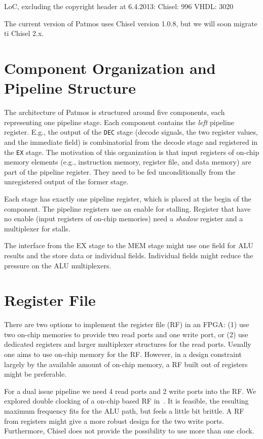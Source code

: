\documentclass[a4paper,fontsize=10pt,twoside,DIV15,BCOR12mm,headinclude=true,footinclude=false,pagesize,bibtotoc]{scrbook}
\newcommand{\code}[1]{{\texttt{#1}}}
\newcommand{\comment}[3]{

\textsf{\textbf{#1}} {\color{#3}#2}}
\newcommand{\martin}[1]{\comment{Martin}{#1}{Blue}}
\renewcommand{\martin}[1]{}
\begin{document}
LoC, excluding the copyright header at 6.4.2013:
Chisel: 996
VHDL: 3020

The current version of Patmos uses Chisel version 1.0.8, but we will soon
migrate ti Chisel 2.x.

\section{Component Organization and Pipeline Structure}

The architecture of Patmos is structured around five components, each
representing one pipeline stage. Each component contains the \emph{left}
pipeline register. E.g., the output of the \code{DEC} stage (decode signals,
the two register values, and the immediate field) is combinatorial from
the decode stage and registered in the \code{EX} stage. The motivation of
this organization is that input registers of on-chip memory elements (e.g., instruction
memory, register file, and data memory) are part of the pipeline register.
They need to be fed unconditionally from the unregistered output of
the former stage.

Each stage has exactly one pipeline register, which is placed at the begin
of the component. The pipeline registers use an enable for stalling.
Register that have no enable (input registers of on-chip memories) need
a \emph{shadow} register and a multiplexer for stalls.

The interface from the EX stage to the MEM stage might use one
field for ALU results and the store data or individual fields. Individual
fields might reduce the pressure on the ALU multiplexers.
\martin{Update to the current implementation -- check for difference.}


\section{Register File}

There are two options to implement the register file (RF) in an FPGA: (1) use
two on-chip memories to provide two read ports and one write port, or (2)
use dedicated registers and larger multiplexer structures for the read
ports. Usually one aims to use on-chip memory for the RF. However,
in a design constraint largely by the available amount of on-chip memory,
a RF built out of registers might be preferable.

For a dual issue pipeline we need 4 read ports and 2 write ports into the RF.
We explored double clocking of a on-chip based RF in~\cite{patmos:ppes2011}.
It is feasible, the resulting maximum frequency fits for the ALU path, but feels
a little bit brittle. A RF from registers might give a more robust design for the
two write ports. Furthermore, Chisel does not provide the possibility to use
more than one clock.
\end{document}
